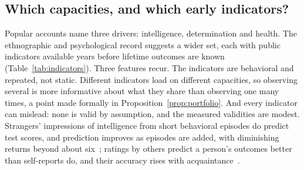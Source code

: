 \subsection{Which capacities, and which early indicators?}\label{sec:indicators}

Popular accounts name three drivers: intelligence, determination and health. The ethnographic and psychological record
suggests a wider set, each with public indicators available years before lifetime outcomes are known
(Table~\ref{tab:indicators}). Three features recur. The indicators are behavioral and repeated, not static. Different
indicators load on different capacities, so observing several is more informative about what they share than observing one
many times, a point made formally in Proposition~\ref{prop:portfolio}. And every indicator can mislead: none is valid by
assumption, and the measured validities are modest. Strangers' impressions of intelligence from short behavioral episodes do
predict test scores, and prediction improves as episodes are added, with diminishing returns beyond about
six~\cite{borkenau2004}; ratings by others predict a person's outcomes better than self-reports do, and their accuracy
rises with acquaintance~\cite{connelly2010}.

